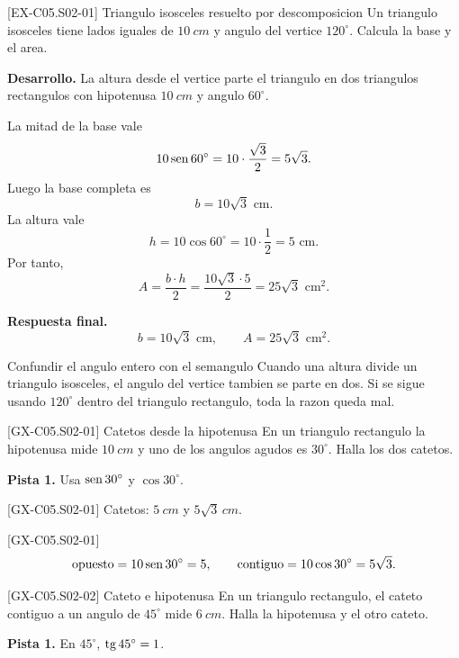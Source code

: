 \begin{solvedexample}{[EX-C05.S02-01] Triangulo isosceles resuelto por descomposicion}
Un triangulo isosceles tiene lados iguales de \(\SI{10}{cm}\) y angulo del vertice
\(120^\circ\). Calcula la base y el area.

\textbf{Desarrollo.} La altura desde el vertice parte el triangulo en dos triangulos
rectangulos con hipotenusa \(\SI{10}{cm}\) y angulo \(60^\circ\).

La mitad de la base vale
\[
10\operatorname{sen} 60^\circ=10\cdot \frac{\sqrt{3}}{2}=5\sqrt{3}.
\]
Luego la base completa es
\[
b=10\sqrt{3}\text{ cm}.
\]
La altura vale
\[
h=10\cos 60^\circ=10\cdot \frac{1}{2}=5\text{ cm}.
\]
Por tanto,
\[
A=\frac{b\cdot h}{2}=\frac{10\sqrt{3}\cdot 5}{2}=25\sqrt{3}\text{ cm}^2.
\]

\textbf{Respuesta final.}
\[
b=10\sqrt{3}\text{ cm},
\qquad
A=25\sqrt{3}\text{ cm}^2.
\]
\end{solvedexample}

\begin{commonerror}{Confundir el angulo entero con el semangulo}
Cuando una altura divide un triangulo isosceles, el angulo del vertice tambien se parte en dos.
Si se sigue usando \(120^\circ\) dentro del triangulo rectangulo, toda la razon queda mal.
\end{commonerror}

\begin{guidedexercise}{[GX-C05.S02-01] Catetos desde la hipotenusa}
En un triangulo rectangulo la hipotenusa mide \(\SI{10}{cm}\) y uno de los angulos agudos es
\(30^\circ\). Halla los dos catetos.

\textbf{Pista 1.} Usa \(\operatorname{sen} 30^\circ\) y \(\cos 30^\circ\).
\end{guidedexercise}

\begin{shortanswer}{[GX-C05.S02-01]}
Catetos: \(\SI{5}{cm}\) y \(5\sqrt{3}\,\si{cm}\).
\end{shortanswer}

\begin{fullsolution}{[GX-C05.S02-01]}
\[
\text{opuesto}=10\operatorname{sen} 30^\circ=5,
\qquad
\text{contiguo}=10\cos 30^\circ=5\sqrt{3}.
\]
\end{fullsolution}

\begin{guidedexercise}{[GX-C05.S02-02] Cateto e hipotenusa}
En un triangulo rectangulo, el cateto contiguo a un angulo de \(45^\circ\) mide \(\SI{6}{cm}\).
Halla la hipotenusa y el otro cateto.

\textbf{Pista 1.} En \(45^\circ\), \(\operatorname{tg} 45^\circ=1\).
\end{guidedexercise}


